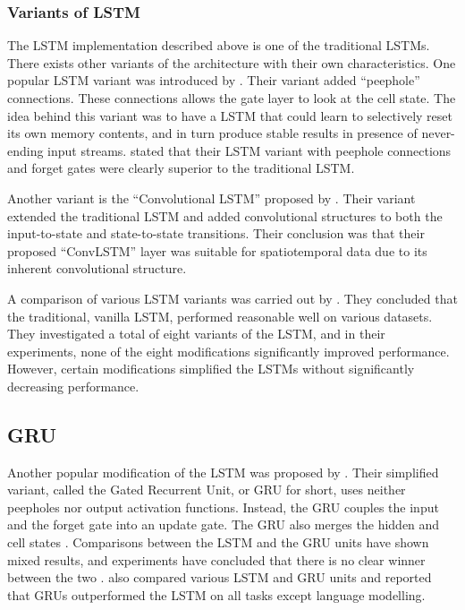 \subsubsection{Variants of LSTM}
The LSTM implementation described above is one of the traditional LSTMs. There exists other variants of the architecture with their own characteristics. One popular LSTM variant was introduced by \cite{gers2001lstm}. Their variant added ``peephole'' connections. These connections allows the gate layer to look at the cell state. The idea behind this variant was to have a LSTM that could learn to selectively reset its own memory contents, and in turn produce stable results in presence of never-ending input streams. \cite{gers2001lstm} stated that their LSTM variant with peephole connections and forget gates were clearly superior to the traditional LSTM. 

Another variant is the ``Convolutional LSTM'' proposed by \cite{xingjian2015convolutional}. Their variant extended the traditional LSTM and added convolutional structures to both the input-to-state and state-to-state transitions. Their conclusion was that their proposed ``ConvLSTM'' layer was suitable for spatiotemporal data due to its inherent convolutional structure.

A comparison of various LSTM variants was carried out by \citep{greff2016lstm}. They concluded that the traditional, vanilla LSTM, performed reasonable well on various datasets. They investigated a total of eight variants of the LSTM, and in their experiments, none of the eight modifications significantly improved performance. However, certain modifications simplified the LSTMs without significantly decreasing performance. 

\subsection{GRU}
Another popular modification of the LSTM was proposed by \cite{chung2014empirical}. Their simplified variant, called the Gated Recurrent Unit, or GRU for short, uses neither peepholes nor output activation functions. Instead, the GRU couples the input and the forget gate into an update gate. The GRU also merges the hidden and cell states  \citep{greff2016lstm, chung2014empirical}. Comparisons between the LSTM and the GRU units have shown mixed results, and experiments have concluded that there is no clear winner between the two \citep{greff2016lstm, chung2014empirical}. \cite{jozefowicz2015empirical} also compared various LSTM and GRU units and reported that GRUs outperformed the LSTM on all tasks except language modelling.

